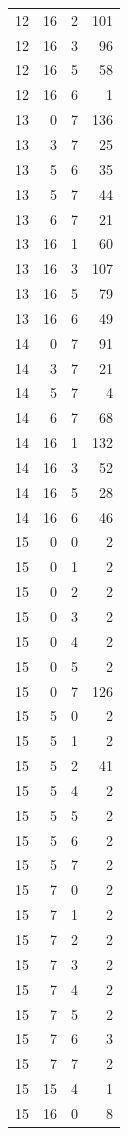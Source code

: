 \begin{longtable}{rrrr}
12 & 16 & 2 & 101\\
12 & 16 & 3 & 96\\
12 & 16 & 5 & 58\\
12 & 16 & 6 & 1\\
13 & 0 & 7 & 136\\
13 & 3 & 7 & 25\\
13 & 5 & 6 & 35\\
13 & 5 & 7 & 44\\
13 & 6 & 7 & 21\\
13 & 16 & 1 & 60\\
13 & 16 & 3 & 107\\
13 & 16 & 5 & 79\\
13 & 16 & 6 & 49\\
14 & 0 & 7 & 91\\
14 & 3 & 7 & 21\\
14 & 5 & 7 & 4\\
14 & 6 & 7 & 68\\
14 & 16 & 1 & 132\\
14 & 16 & 3 & 52\\
14 & 16 & 5 & 28\\
14 & 16 & 6 & 46\\
15 & 0 & 0 & 2\\
15 & 0 & 1 & 2\\
15 & 0 & 2 & 2\\
15 & 0 & 3 & 2\\
15 & 0 & 4 & 2\\
15 & 0 & 5 & 2\\
15 & 0 & 7 & 126\\
15 & 5 & 0 & 2\\
15 & 5 & 1 & 2\\
15 & 5 & 2 & 41\\
15 & 5 & 4 & 2\\
15 & 5 & 5 & 2\\
15 & 5 & 6 & 2\\
15 & 5 & 7 & 2\\
15 & 7 & 0 & 2\\
15 & 7 & 1 & 2\\
15 & 7 & 2 & 2\\
15 & 7 & 3 & 2\\
15 & 7 & 4 & 2\\
15 & 7 & 5 & 2\\
15 & 7 & 6 & 3\\
15 & 7 & 7 & 2\\
15 & 15 & 4 & 1\\
15 & 16 & 0 & 8\\

\end{longtable}

